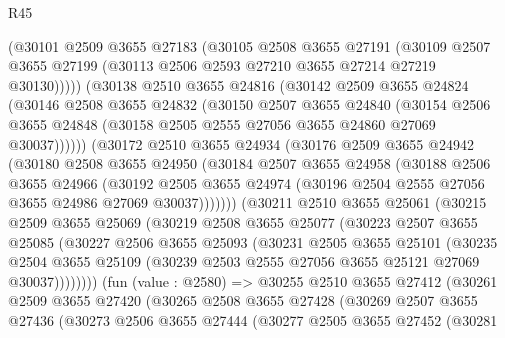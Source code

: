 \begin{lexlean}{R45}
\begin{coremodule}
          (@30101
            @2509
            @3655
            @27183
            (@30105
              @2508
              @3655
              @27191
              (@30109 @2507 @3655 @27199 (@30113 @2506 @2593 @27210 @3655 @27214 @27219 @30130)))))
        (@30138
          @2510
          @3655
          @24816
          (@30142
            @2509
            @3655
            @24824
            (@30146
              @2508
              @3655
              @24832
              (@30150
                @2507
                @3655
                @24840
                (@30154
                  @2506
                  @3655
                  @24848
                  (@30158 @2505 @2555 @27056 @3655 @24860 @27069 @30037))))))
        (@30172
          @2510
          @3655
          @24934
          (@30176
            @2509
            @3655
            @24942
            (@30180
              @2508
              @3655
              @24950
              (@30184
                @2507
                @3655
                @24958
                (@30188
                  @2506
                  @3655
                  @24966
                  (@30192
                    @2505
                    @3655
                    @24974
                    (@30196 @2504 @2555 @27056 @3655 @24986 @27069 @30037)))))))
        (@30211
          @2510
          @3655
          @25061
          (@30215
            @2509
            @3655
            @25069
            (@30219
              @2508
              @3655
              @25077
              (@30223
                @2507
                @3655
                @25085
                (@30227
                  @2506
                  @3655
                  @25093
                  (@30231
                    @2505
                    @3655
                    @25101
                    (@30235
                      @2504
                      @3655
                      @25109
                      (@30239 @2503 @2555 @27056 @3655 @25121 @27069 @30037))))))))
        (fun (value : @2580) =>
        @30255
          @2510
          @3655
          @27412
          (@30261
            @2509
            @3655
            @27420
            (@30265
              @2508
              @3655
              @27428
              (@30269
                @2507
                @3655
                @27436
                (@30273
                  @2506
                  @3655
                  @27444
                  (@30277
                    @2505
                    @3655
                    @27452
                    (@30281

\end{coremodule}
\end{lexlean}
